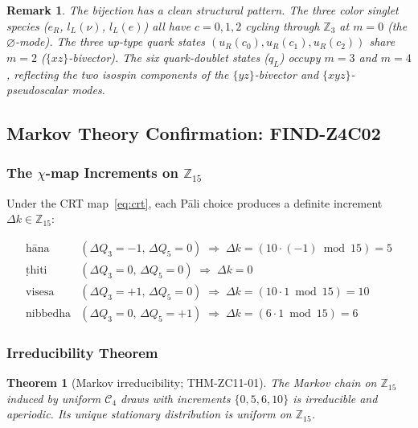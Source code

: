 \documentclass[12pt, a4paper]{article}
\newtheorem{theorem}{Theorem}[section]
\newtheorem{remark}{Remark}[section]
\begin{document}
\begin{remark}
The bijection has a clean structural pattern. The three color singlet
species ($e_R$, $l_L(\nu)$, $l_L(e)$) all have $c=0,1,2$ cycling
through $\mathbb{Z}_3$ at $m=0$ (the $\varnothing$-mode). The three
up-type quark states $(u_R(c_0), u_R(c_1), u_R(c_2))$ share $m=2$
($\{xz\}$-bivector). The six quark-doublet states ($q_L$) occupy $m=3$
and $m=4$, reflecting the two isospin components of the
$\{yz\}$-bivector and $\{xyz\}$-pseudoscalar modes.
\end{remark}

\subsection{Markov Theory Confirmation: FIND-Z4C02}
\label{sec:markov}

\subsubsection{The $\chi$-map Increments on $\mathbb{Z}_{15}$}

Under the CRT map~\eqref{eq:crt}, each Pāli choice produces a
definite increment $\Delta k \in \mathbb{Z}_{15}$:

\begin{equation}
  \begin{array}{ll}
    \text{hāna}     & (\Delta Q_3 = -1,\, \Delta Q_5 = 0)
      \;\Rightarrow\; \Delta k = (10\cdot(-1)\bmod 15) = 5 \\[2pt]
    \text{ṭhiti}    & (\Delta Q_3 = 0,\, \Delta Q_5 = 0)
      \;\Rightarrow\; \Delta k = 0 \\[2pt]
    \text{visesa}   & (\Delta Q_3 = +1,\, \Delta Q_5 = 0)
      \;\Rightarrow\; \Delta k = (10\cdot 1\bmod 15) = 10 \\[2pt]
    \text{nibbedha} & (\Delta Q_3 = 0,\, \Delta Q_5 = +1)
      \;\Rightarrow\; \Delta k = (6\cdot 1\bmod 15) = 6
  \end{array}
  \label{eq:dk}
\end{equation}

\subsubsection{Irreducibility Theorem}

\begin{theorem}[Markov irreducibility; THM-ZC11-01]
\label{thm:irreducible}
The Markov chain on $\mathbb{Z}_{15}$ induced by uniform $\mathcal{C}_4$
draws with increments $\{0, 5, 6, 10\}$ is \emph{irreducible and
aperiodic}. Its unique stationary distribution is uniform on
$\mathbb{Z}_{15}$.
\end{theorem}
\end{document}
